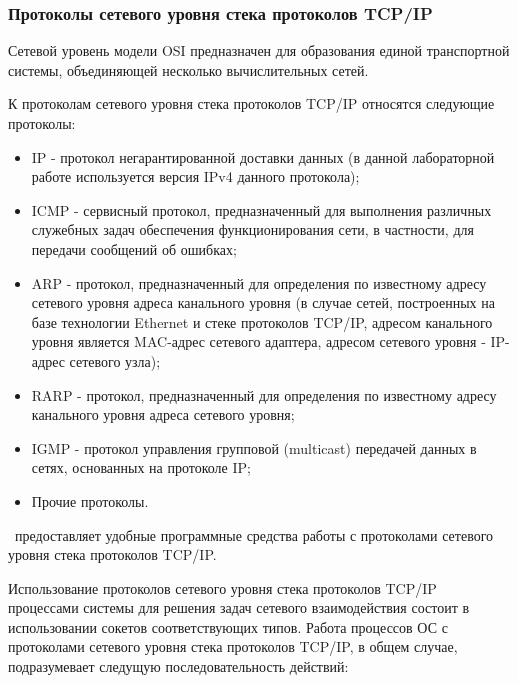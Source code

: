 
\subsubsection{Протоколы сетевого уровня стека протоколов TCP/IP}

	Сетевой уровень модели OSI предназначен для образования единой транспортной системы, объединяющей несколько вычислительных сетей.

	К протоколам сетевого уровня стека протоколов TCP/IP относятся следующие протоколы:

	\begin{itemize}

		\item IP - протокол негарантированной доставки данных (в данной лабораторной работе используется версия IPv4 данного протокола);
		\item ICMP - сервисный протокол, предназначенный для выполнения различных служебных задач обеспечения функционирования сети, в частности,
		для передачи сообщений об ошибках;
		\item ARP - протокол, предназначенный для определения по известному адресу сетевого уровня адреса канального уровня (в случае сетей, построенных
		на базе технологии Ethernet и стеке протоколов TCP/IP, адресом канального уровня является MAC-адрес сетевого адаптера, адресом сетевого уровня -
		IP-адрес сетевого узла);
		\item RARP - протокол, предназначенный для определения по известному адресу канального уровня адреса сетевого уровня;
		\item IGMP - протокол управления групповой (multicast) передачей данных в сетях, основанных на протоколе IP;
		\item Прочие протоколы.

	\end{itemize}

	\linux\ предоставляет удобные программные средства работы с протоколами сетевого уровня стека протоколов TCP/IP.

	Использование протоколов сетевого уровня стека протоколов TCP/IP процессами системы для решения задач сетевого взаимодействия состоит в использовании
	сокетов соответствующих типов. Работа процессов ОС с протоколами сетевого уровня стека протоколов TCP/IP, в общем случае,
	подразумевает следущую последовательность действий:

